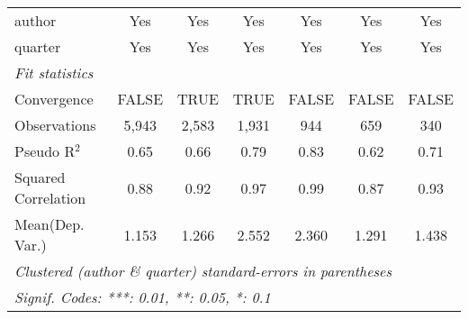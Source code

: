 \begin{tabular}{lcccccc}
   author                                                     & Yes           & Yes           & Yes           & Yes           & Yes          & Yes\\  
   quarter                                                    & Yes           & Yes           & Yes           & Yes           & Yes          & Yes\\  
   \midrule
   \emph{Fit statistics}\\
   Convergence                                                &FALSE          & TRUE          & TRUE          & FALSE         & FALSE        & FALSE\\  
   Observations                                               & 5,943         & 2,583         & 1,931         & 944           & 659          & 340\\  
   Pseudo R$^2$                                               & 0.65          & 0.66          & 0.79          & 0.83          & 0.62         & 0.71\\  
   Squared Correlation                                        & 0.88          & 0.92          & 0.97          & 0.99          & 0.87         & 0.93\\  
Mean(Dep. Var.) & 1.153 & 1.266 & 2.552 & 2.360 & 1.291 & 1.438 \\
   \midrule \midrule
   \multicolumn{7}{l}{\emph{Clustered (author \& quarter) standard-errors in parentheses}}\\
   \multicolumn{7}{l}{\emph{Signif. Codes: ***: 0.01, **: 0.05, *: 0.1}}\\
\end{tabular}
\par\endgroup
